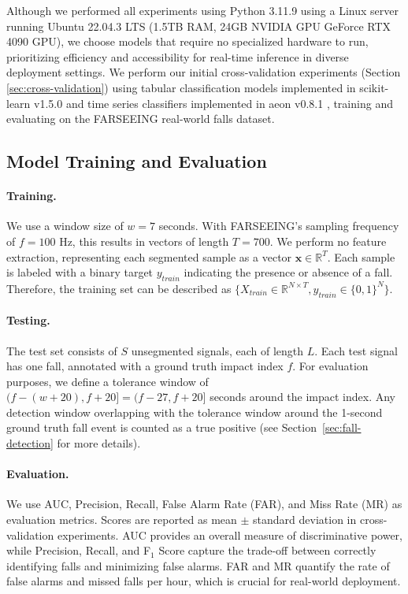\documentclass[runningheads]{llncs}
\begin{document}
Although we performed all experiments using Python 3.11.9 using a Linux server running Ubuntu 22.04.3 LTS (1.5TB RAM, 24GB NVIDIA GPU GeForce RTX 4090 GPU), we choose models that require no specialized hardware to run, prioritizing efficiency and accessibility for real-time inference in diverse deployment settings. We perform our initial cross-validation experiments (Section \ref{sec:cross-validation})  using tabular classification models implemented in scikit-learn v1.5.0 \cite{pedregosa2011scikit} and time series classifiers implemented in aeon v0.8.1 \cite{middlehurst2024aeon}, training and evaluating on the FARSEEING real-world falls dataset. 

\subsection{Model Training and Evaluation}
\label{sec:training-and-eval}
\paragraph{Training.} We use a window size of $w = 7$ seconds. With FARSEEING's sampling frequency of $f = 100$ Hz, this results in vectors of length $T = 700$. We perform no feature extraction, representing each segmented sample as a vector $\textbf{x} \in \mathbb{R}^T$. Each sample is labeled with a binary target $y_{train}$ indicating the presence or absence of a fall. Therefore, the training set can be described as $\{X_{train} \in \mathbb{R}^{N \times T}, y_{train} \in \{0,1\}^N \}$.

\paragraph{Testing.} The test set consists of $S$ unsegmented signals, each of length $L$. Each test signal has one fall, annotated with a ground truth impact index $f$. For evaluation purposes, we define a tolerance window of $(f-(w+20), f+20] = (f-27, f+20]$ seconds around the impact index. Any detection window overlapping with the tolerance window around the 1-second ground truth fall event is counted as a true positive (see Section~\ref{sec:fall-detection} for more details).

\paragraph{Evaluation.} We use AUC, Precision, Recall, False Alarm Rate (FAR), and Miss Rate (MR) as evaluation metrics. Scores are reported as mean $\pm$ standard deviation in cross-validation experiments. AUC provides an overall measure of discriminative power, while Precision, Recall, and F$_1$ Score capture the trade-off between correctly identifying falls and minimizing false alarms. FAR and MR quantify the rate of false alarms and missed falls per hour, which is crucial for real-world deployment.
\end{document}
